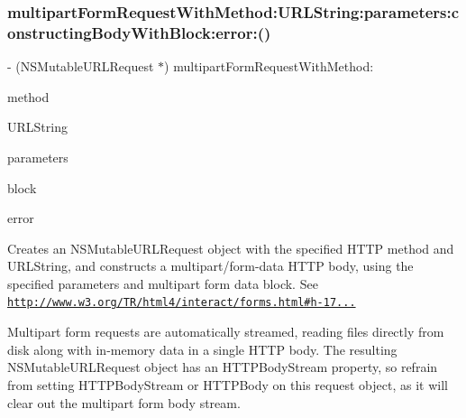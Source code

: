 \subsubsection{\texorpdfstring{multipart\+Form\+Request\+With\+Method\+:\+U\+R\+L\+String\+:parameters\+:constructing\+Body\+With\+Block\+:error\+:()}{multipartFormRequestWithMethod:URLString:parameters:constructingBodyWithBlock:error:()}\hspace{0.1cm}{\footnotesize\ttfamily [1/3]}}
{\footnotesize\ttfamily -\/ (N\+S\+Mutable\+U\+R\+L\+Request $\ast$) multipart\+Form\+Request\+With\+Method\+: \begin{DoxyParamCaption}\item[{(N\+S\+String $\ast$)}]{method }\item[{URLString:(N\+S\+String $\ast$)}]{U\+R\+L\+String }\item[{parameters:(nullable N\+S\+Dictionary $\ast$)}]{parameters }\item[{constructingBodyWithBlock:(nullable void($^\wedge$)(id$<$ \mbox{\hyperlink{protocol_a_f_multipart_form_data-p}{A\+F\+Multipart\+Form\+Data}} $>$ form\+Data))}]{block }\item[{error:(N\+S\+Error $\ast$\+\_\+\+\_\+nullable \+\_\+\+\_\+autoreleasing $\ast$)}]{error }\end{DoxyParamCaption}}

Creates an {\ttfamily N\+S\+Mutable\+U\+R\+L\+Request} object with the specified H\+T\+TP method and U\+R\+L\+String, and constructs a {\ttfamily multipart/form-\/data} H\+T\+TP body, using the specified parameters and multipart form data block. See \href{http://www.w3.org/TR/html4/interact/forms.html#h-17.13.4.2}{\tt http\+://www.\+w3.\+org/\+T\+R/html4/interact/forms.\+html\#h-\/17...}

Multipart form requests are automatically streamed, reading files directly from disk along with in-\/memory data in a single H\+T\+TP body. The resulting {\ttfamily N\+S\+Mutable\+U\+R\+L\+Request} object has an {\ttfamily H\+T\+T\+P\+Body\+Stream} property, so refrain from setting {\ttfamily H\+T\+T\+P\+Body\+Stream} or {\ttfamily H\+T\+T\+P\+Body} on this request object, as it will clear out the multipart form body stream.


